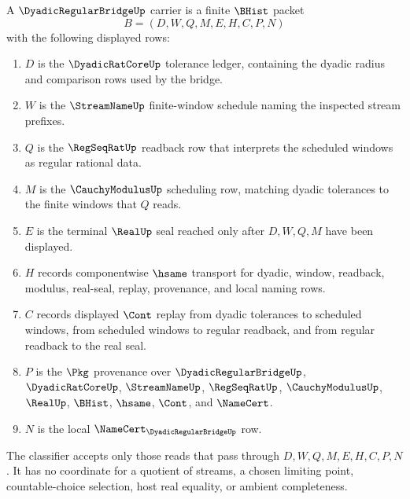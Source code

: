 \begin{definition}
\label{def:dyadic-regular-bridge-carrier}
A $\DyadicRegularBridgeUp$ carrier is a finite $\BHist$ packet
$$
B=(D,W,Q,M,E,H,C,P,N)
$$
with the following displayed rows:
\begin{enumerate}
\item $D$ is the $\DyadicRatCoreUp$ tolerance ledger, containing the dyadic radius and comparison rows used by the bridge.
\item $W$ is the $\StreamNameUp$ finite-window schedule naming the inspected stream prefixes.
\item $Q$ is the $\RegSeqRatUp$ readback row that interprets the scheduled windows as regular rational data.
\item $M$ is the $\CauchyModulusUp$ scheduling row, matching dyadic tolerances to the finite windows that $Q$ reads.
\item $E$ is the terminal $\RealUp$ seal reached only after $D,W,Q,M$ have been displayed.
\item $H$ records componentwise $\hsame$ transport for dyadic, window, readback, modulus, real-seal, replay, provenance, and local naming rows.
\item $C$ records displayed $\Cont$ replay from dyadic tolerances to scheduled windows, from scheduled windows to regular readback, and from regular readback to the real seal.
\item $P$ is the $\Pkg$ provenance over $\DyadicRegularBridgeUp$, $\DyadicRatCoreUp$, $\StreamNameUp$, $\RegSeqRatUp$, $\CauchyModulusUp$, $\RealUp$, $\BHist$, $\hsame$, $\Cont$, and $\NameCert$.
\item $N$ is the local $\NameCert_{\DyadicRegularBridgeUp}$ row.
\end{enumerate}
The classifier accepts only those reads that pass through $D,W,Q,M,E,H,C,P,N$. It has no coordinate for a quotient of streams, a chosen limiting point, countable-choice selection, host real equality, or ambient completeness.
\end{definition}

